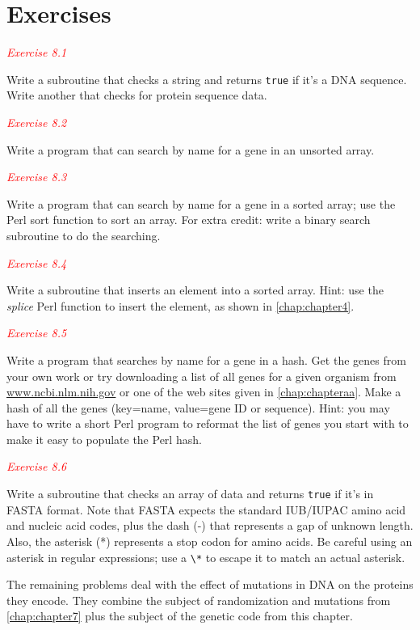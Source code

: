 \section{Exercises}
\textcolor{red}{\textit{Exercise 8.1}}
\begin{adjustwidth}{1cm}{}
Write a subroutine that checks a string and returns \verb|true| if it's a DNA sequence. Write another that checks for protein sequence data. 
\end{adjustwidth}

\textcolor{red}{\textit{Exercise 8.2}}
\begin{adjustwidth}{1cm}{}
Write a program that can search by name for a gene in an unsorted array.
\end{adjustwidth}

\textcolor{red}{\textit{Exercise 8.3}}
\begin{adjustwidth}{1cm}{}
Write a program that can search by name for a gene in a sorted array; use the Perl sort function to sort an array. For extra credit: write a binary search subroutine to do the searching. 
\end{adjustwidth}

\textcolor{red}{\textit{Exercise 8.4}}
\begin{adjustwidth}{1cm}{}
Write a subroutine that inserts an element into a sorted array. Hint: use the \textit{splice} Perl function to insert the element, as shown in \autoref{chap:chapter4}. 
\end{adjustwidth}

\textcolor{red}{\textit{Exercise 8.5}}
\begin{adjustwidth}{1cm}{}
Write a program that searches by name for a gene in a hash. Get the genes from your own work or try downloading a list of all genes for a given organism from \href{www.ncbi.nlm.nih.gov}{www.ncbi.nlm.nih.gov} or one of the web sites given in \autoref{chap:chapteraa}. Make a hash of all the genes (key=name, value=gene ID or sequence). Hint: you may have to write a short Perl program to reformat the list of genes you start with to make it easy to populate the Perl hash. 
\end{adjustwidth}

\textcolor{red}{\textit{Exercise 8.6}}
\begin{adjustwidth}{1cm}{}
Write a subroutine that checks an array of data and returns \verb|true| if it's in FASTA format. Note that FASTA expects the standard IUB/IUPAC amino acid and nucleic acid codes, plus the dash (-) that represents a gap of unknown length. Also, the asterisk (*) represents a stop codon for amino acids. Be careful using an asterisk in regular expressions; use a \verb|\*| to escape it to match an actual asterisk. 

The remaining problems deal with the effect of mutations in DNA on the proteins they encode. They combine the subject of randomization and mutations from \autoref{chap:chapter7} plus the subject of the genetic code from this chapter. 
\end{adjustwidth}

